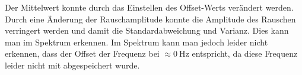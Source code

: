 \documentclass{article}						%
\begin{document}
		Der Mittelwert konnte durch das Einstellen des Offset-Werts verändert werden. Durch eine Änderung der Rauschamplitude konnte die Amplitude des Rauschen verringert werden und damit die Standardabweichung und Varianz. Dies kann man im Spektrum erkennen.
		Im Spektrum kann man jedoch leider nicht erkennen, dass der Offset der Frequenz bei $ \approx \SI{0}{\hertz} $ entspricht, da diese Frequenz leider nicht mit abgespeichert wurde.
		
		\begin{figure}[h!]
		\end{figure}
		
\end{document}
